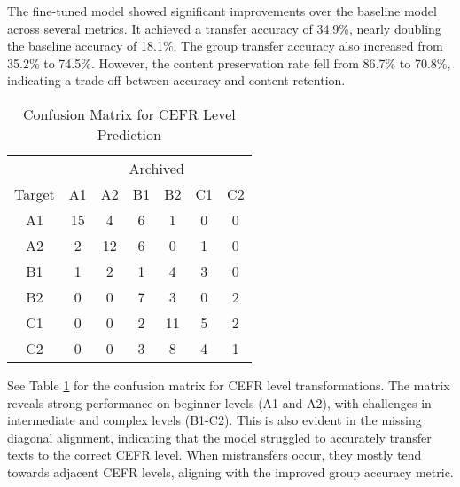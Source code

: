 The fine-tuned model showed significant improvements over the baseline model across several metrics. It achieved a transfer accuracy of 34.9\%, nearly doubling the baseline accuracy of 18.1\%. The group transfer accuracy also increased from 35.2\% to 74.5\%. However, the content preservation rate fell from 86.7\% to 70.8\%, indicating a trade-off between accuracy and content retention.
\begin{table}[ht]
    \centering
    \begin{tabular}{c|cccccc}
        & \multicolumn{6}{c}{Archived} \\
        Target & A1 & A2 & B1 & B2 & C1 & C2 \\
        \hline
        A1 & \cellcolor[rgb]{0.2,0.8,0.2}15 & \cellcolor[rgb]{0.9,1,0.9}4 & \cellcolor[rgb]{0.8,0.97,0.8}6 & \cellcolor[rgb]{0.97,1,0.97}1 & \cellcolor[rgb]{1,1,1}0 & \cellcolor[rgb]{1,1,1}0 \\
        A2 & \cellcolor[rgb]{0.95,1,0.95}2 & \cellcolor[rgb]{0.28,0.83,0.28}12 & \cellcolor[rgb]{0.8,0.97,0.8}6 & \cellcolor[rgb]{1,1,1}0 & \cellcolor[rgb]{0.97,1,0.97}1 & \cellcolor[rgb]{1,1,1}0 \\
        B1 & \cellcolor[rgb]{0.97,1,0.97}1 & \cellcolor[rgb]{0.95,1,0.95}2 & \cellcolor[rgb]{0.97,1,0.97}1 & \cellcolor[rgb]{0.9,1,0.9}4 & \cellcolor[rgb]{0.92,1,0.92}3 & \cellcolor[rgb]{1,1,1}0 \\
        B2 & \cellcolor[rgb]{1,1,1}0 & \cellcolor[rgb]{1,1,1}0 & \cellcolor[rgb]{0.72,0.95,0.72}7 & \cellcolor[rgb]{0.92,1,0.92}3 & \cellcolor[rgb]{1,1,1}0 & \cellcolor[rgb]{0.95,1,0.95}2 \\
        C1 & \cellcolor[rgb]{1,1,1}0 & \cellcolor[rgb]{1,1,1}0 & \cellcolor[rgb]{0.95,1,0.95}2 & \cellcolor[rgb]{0.34,0.84,0.34}11 & \cellcolor[rgb]{0.85,0.98,0.85}5 & \cellcolor[rgb]{0.95,1,0.95}2 \\
        C2 & \cellcolor[rgb]{1,1,1}0 & \cellcolor[rgb]{1,1,1}0 & \cellcolor[rgb]{0.92,1,0.92}3 & \cellcolor[rgb]{0.63,0.92,0.63}8 & \cellcolor[rgb]{0.9,1,0.9}4 & \cellcolor[rgb]{0.97,1,0.97}1 \\
    \end{tabular}
    \caption{Confusion Matrix for CEFR Level Prediction}
    \label{tab:cefr_confusion_matrix}
\end{table}
See Table \ref{tab:cefr_confusion_matrix} for the confusion matrix for CEFR level transformations. The matrix reveals strong performance on beginner levels (A1 and A2), with challenges in intermediate and complex levels (B1-C2). This is also evident in the missing diagonal alignment, indicating that the model struggled to accurately transfer texts to the correct CEFR level. When mistransfers occur, they mostly tend towards adjacent CEFR levels, aligning with the improved group accuracy metric.
